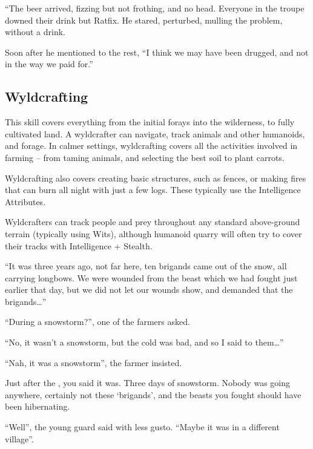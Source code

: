 \begin{multicols}{2}
\else

\begin{exampletext}
  ``The beer arrived, fizzing but not frothing, and no head.
  Everyone in the troupe downed their drink but Ratfix.
  He stared, perturbed, mulling the problem, without a drink.

  Soon after he mentioned to the rest,
  ``I think we may have been drugged, and not in the way we paid for.''
\end{exampletext}
\fi

\subsection{Wyldcrafting}

This skill covers everything from the initial forays into the wilderness, to fully cultivated land.
A wyldcrafter can navigate, track animals and other humanoids, and forage.
In calmer settings, wyldcrafting covers all the activities involved in farming -- from taming animals, and selecting the best soil to plant carrots.

Wyldcrafting also covers creating basic structures, such as fences, or making fires that can burn all night with just a few logs.
These typically use the Intelligence Attributes.

Wyldcrafters can track people and prey throughout any standard above-ground terrain (typically using Wits), although humanoid quarry will often try to cover their tracks with Intelligence + Stealth.

\begin{exampletext}
  ``It was three years ago, not far here, ten brigands came out of the snow, all carrying longbows.
  We were wounded from the beast which we had fought just earlier that day, but we did not let our wounds show, and demanded that the brigands\ldots''

  ``During a snowstorm?'', one of the farmers asked.

  ``No, it wasn't a snowstorm, but the cold was bad, and so I said to them\ldots''

  ``Nah, it was a snowstorm'', the farmer insisted.

  Just after the \iftoggle{aif}{eclipse of \gls{ainumar}}{blue moon}, you said it was.
  Three days of snowstorm.
  Nobody was going anywhere, certainly not these `brigands', and the beasts you fought should have been hibernating.

  ``Well'', the young guard said with less gusto.
  ``Maybe it was in a different village''.

\end{exampletext}

\end{multicols}

